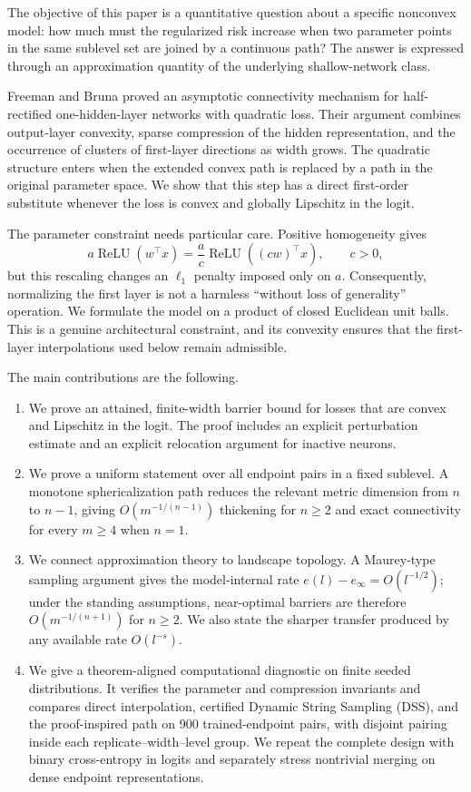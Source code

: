 \documentclass[pdflatex,sn-mathphys-num]{sn-jnl}
\theoremstyle{thmstyleone}
\theoremstyle{thmstyletwo}
\theoremstyle{thmstylethree}
\newcommand{\relu}{\operatorname{ReLU}}
\begin{document}
The objective of this paper is a quantitative question about a specific nonconvex model: how much must the regularized risk increase when two parameter points in the same sublevel set are joined by a continuous path?  The answer is expressed through an approximation quantity of the underlying shallow-network class.

Freeman and Bruna \cite{FreemanBruna2017} proved an asymptotic connectivity mechanism for half-rectified one-hidden-layer networks with quadratic loss. Their argument combines output-layer convexity, sparse compression of the hidden representation, and the occurrence of clusters of first-layer directions as width grows. The quadratic structure enters when the extended convex path is replaced by a path in the original parameter space. We show that this step has a direct first-order substitute whenever the loss is convex and globally Lipschitz in the logit.

The parameter constraint needs particular care. Positive homogeneity gives
\[
 a\relu(w^\top x)=\frac{a}{c}\relu((cw)^\top x),\qquad c>0,
\]
but this rescaling changes an $\ell_1$ penalty imposed only on $a$. Consequently, normalizing the first layer is not a harmless ``without loss of generality'' operation. We formulate the model on a product of closed Euclidean unit balls. This is a genuine architectural constraint, and its convexity ensures that the first-layer interpolations used below remain admissible.

The main contributions are the following.
\begin{enumerate}
\item We prove an attained, finite-width barrier bound for losses that are convex and Lipschitz in the logit. The proof includes an explicit perturbation estimate and an explicit relocation argument for inactive neurons.
\item We prove a uniform statement over all endpoint pairs in a fixed sublevel. A monotone sphericalization path reduces the relevant metric dimension from $n$ to $n-1$, giving $O(m^{-1/(n-1)})$ thickening for $n\ge2$ and exact connectivity for every $m\ge4$ when $n=1$.
\item We connect approximation theory to landscape topology. A Maurey-type sampling argument gives the model-internal rate $e(l)-e_\infty=O(l^{-1/2})$; under the standing assumptions, near-optimal barriers are therefore $O(m^{-1/(n+1)})$ for $n\ge2$. We also state the sharper transfer produced by any available rate $O(l^{-s})$.
\item We give a theorem-aligned computational diagnostic on finite seeded distributions. It verifies the parameter and compression invariants and compares direct interpolation, certified Dynamic String Sampling (DSS), and the proof-inspired path on 900 trained-endpoint pairs, with disjoint pairing inside each replicate--width--level group. We repeat the complete design with binary cross-entropy in logits and separately stress nontrivial merging on dense endpoint representations.
\end{enumerate}
\end{document}
